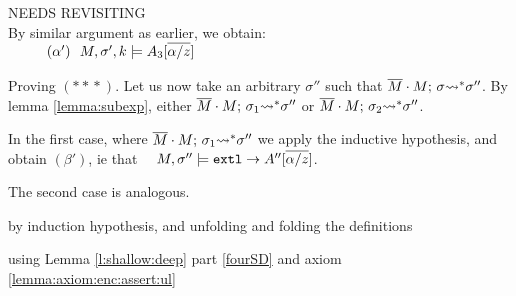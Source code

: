 \begin{description}
NEEDS REVISITING
\\
By similar argument as earlier, we obtain:\\
 $\strut \ \ \hspace{0.5cm} \ \  (\alpha') \ \ M,\sigma' ,{k} \models {A_3[\overline{\alpha/z}]} $ 
 
 \vspace{.1cm}
Proving $(*\!*\!*)$.
Let us now take an arbitrary $\sigma''$ such that   $\overline{M}\cdot M;\, {\sigma} {\rightsquigarrow^*} \sigma''$. By
lemma  \ref{lemma:subexp}, either $\overline{M}\cdot M;\, {\sigma_1} {\rightsquigarrow^*} \sigma''$ or
$\overline{M}\cdot M;\, {\sigma_2} {\rightsquigarrow^*} \sigma''$. 

In the first case, where $\overline{M}\cdot M;\, {\sigma_1} {\rightsquigarrow^*} \sigma''$ we apply the inductive hypothesis, and obtain $(\beta')$, ie that \ \ $ M, \sigma'' \models \mbox{\normalfont{\texttt{extl}}} \rightarrow A''[\overline{\alpha/z}]$.

 The second case is analogous.
 
  \item[{\sc{combine}}]  by induction hypothesis, and unfolding and folding the definitions
  
 \item[{\sc{consequ}}]  using Lemma \ref{l:shallow:deep} part \ref{fourSD}  and axiom \ref{lemma:axiom:enc:assert:ul}

%
%
\item[{\sc{Call\_Int}}]
 

\end{description}
